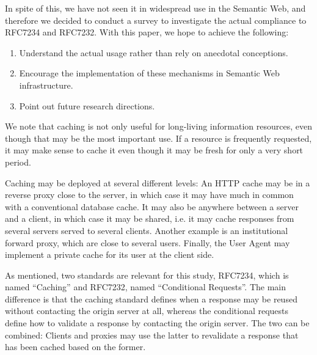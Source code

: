 \documentclass{llncs}
\begin{document}
In spite of this, we have not seen it in widespread use in the
Semantic Web, and therefore we decided to conduct a survey to
investigate the actual compliance to RFC7234 and RFC7232. 
With this paper, we hope to achieve the following:
\begin{enumerate}
\item Understand the actual usage rather than rely on anecdotal
  conceptions.
\item Encourage the implementation of these mechanisms in Semantic Web
  infrastructure.
\item Point out future research directions.
\end{enumerate}

We note that caching is not only useful for long-living information
resources, even though that may be the most important use. If a resource
is frequently requested, it may make sense to cache it even though it
may be fresh for only a very short period.

Caching may be deployed at several different levels: An HTTP cache may
be in a reverse proxy close to the server, in which case it may have
much in common with a conventional database cache. It may also be
anywhere between a server and a client, in which case it may be
shared, i.e. it may cache responses from several servers served to
several clients. Another example is an institutional forward proxy,
which are close to several users. Finally, the User Agent may
implement a private cache for its user at the client side.

As mentioned, two standards are relevant for this study, RFC7234,
which is named ``Caching'' and RFC7232, named ``Conditional
Requests''. The main difference is that the caching standard defines
when a response may be reused without contacting the origin server at
all, whereas the conditional requests define how to validate a
response by contacting the origin server. The two can be combined:
Clients and proxies may use the latter to revalidate a response that
has been cached based on the former.
\end{document}
